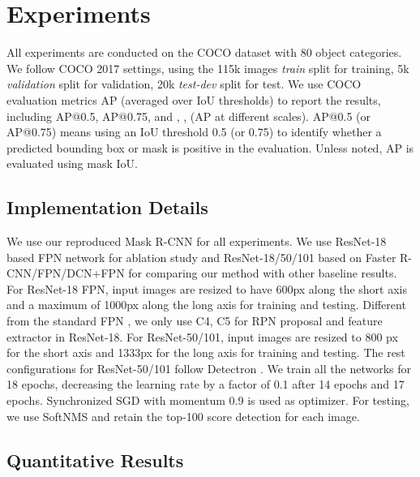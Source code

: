 \documentclass[10pt,twocolumn,letterpaper]{article}
\begin{document}
\section{Experiments}


    All experiments are conducted on the COCO dataset \cite{lin2014microsoftcoco} with 80 object categories. We follow COCO 2017 settings, using the 115k images \emph{train} split for training, 5k \emph{validation} split for validation, 20k \emph{test-dev} split for test. We use COCO evaluation metrics AP (averaged over IoU thresholds) to report the results, including AP@0.5, AP@0.75, and , ,  (AP at different scales). 
    AP@0.5 (or AP@0.75) means using an IoU threshold 0.5 (or 0.75) to identify whether a predicted bounding box or mask is positive in the evaluation.
    Unless noted, AP is evaluated using mask IoU.
    
\subsection{Implementation Details}
    We use our reproduced Mask R-CNN for all experiments. We use ResNet-18 based FPN network for ablation study and ResNet-18/50/101 based on Faster R-CNN/FPN/DCN+FPN \cite{dai2017deformable} for comparing our method with other baseline results. For ResNet-18 FPN, input images are resized to have 600px along the short axis and a maximum of 1000px along the long axis for training and testing. Different from the standard FPN \cite{lin2017fpn}, we only use C4, C5 for RPN proposal and feature extractor in ResNet-18. For ResNet-50/101, input images are resized to 800 px for the short axis and 1333px for the long axis for training and testing. The rest configurations for ResNet-50/101 follow Detectron \cite{Detectron2018}. 
    We train all the networks for 18 epochs, decreasing the learning rate by a factor of 0.1 after 14 epochs and 17 epochs. Synchronized SGD with momentum 0.9 is used as optimizer. For testing, we use SoftNMS and retain the top-100 score detection for each image.



\subsection{Quantitative Results}
\end{document}
